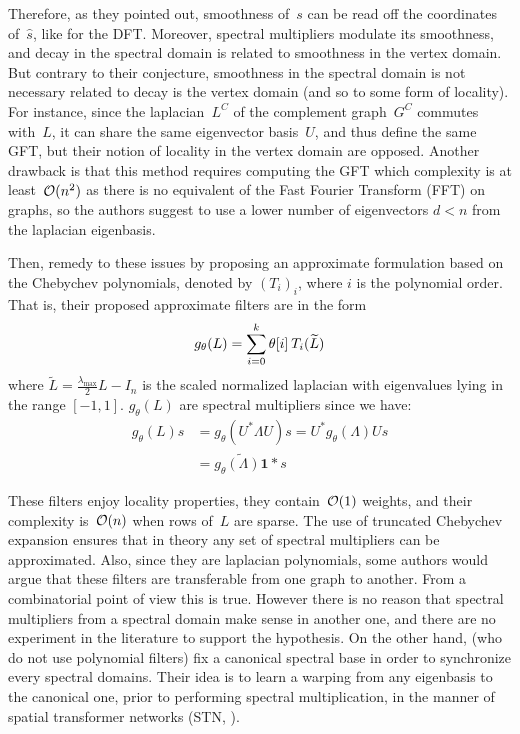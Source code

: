 Therefore, as they pointed out, smoothness of~$s$ can be read off the coordinates of~$\hat{s}$, like for the DFT. Moreover, spectral multipliers modulate its smoothness, and decay in the spectral domain is related to smoothness in the vertex domain. But contrary to their conjecture, smoothness in the spectral domain is not necessary related to decay is the vertex domain (and so to some form of locality). For instance, since the laplacian~$L^C$ of the complement graph~$G^C$ commutes with~$L$, it can share the same eigenvector basis~$U$, and thus define the same GFT, but their notion of locality in the vertex domain are opposed. Another drawback is that this method requires computing the GFT which complexity is at least~$\co(n^2)$ as there is no equivalent of the Fast Fourier Transform (FFT) on graphs, so the authors suggest to use a lower number of eigenvectors $d < n$ from the laplacian eigenbasis.

Then, \cite{defferrard2016convolutional} remedy to these issues by proposing an approximate formulation based on the Chebychev polynomials, denoted by $(T_i)_i$, where $i$ is the polynomial order.
That is, their proposed approximate filters are in the form
\begin{gather}
g_\theta(L) = \sum_{i=0}^k \theta[i] \h{2} T_i(\widetilde{L}) \label{eq:cheb}
\end{gather}
where $\widetilde{L} = \frac{\lambda_{\max}}2L - I_n$ is the scaled normalized laplacian with eigenvalues lying in the range $[-1,1]$. $g_\theta(L)$ are spectral multipliers since we have:
\begin{align}
g_\theta(L)s &= g_\theta(U^*\Lambda U)s
= U^* g_\theta(\Lambda) Us\nonumber\\
&= \widetilde{g_\theta(\Lambda) \mathbf1} \ast s
\end{align}

These filters enjoy locality properties, they contain~$\co(1)$ weights, and their complexity is~$\co(n)$ when rows of~$L$ are sparse. The use of truncated Chebychev expansion \citep{hammond2011wavelets} ensures that in theory any set of spectral multipliers can be approximated. Also, since they are laplacian polynomials, some authors would argue that these filters are transferable from one graph to another. From a combinatorial point of view this is true. However there is no reason that spectral multipliers from a spectral domain make sense in another one, and there are no experiment in the literature to support the hypothesis. On the other hand, \citep{yi2016syncspeccnn} (who do not use polynomial filters) fix a canonical spectral base in order to synchronize every spectral domains. Their idea is to learn a warping from any eigenbasis to the canonical one, prior to performing spectral multiplication, in the manner of spatial transformer networks (STN, \cite{jaderberg2015spatial}).

